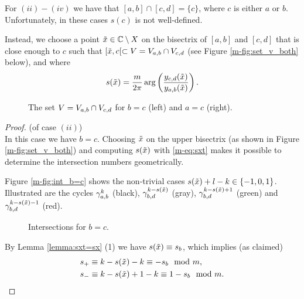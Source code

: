 \documentclass[main.tex]{subfiles}
\begin{document}
  For $(ii)-(iv)$ we have that $[a,b] \cap [c,d] = \{c \}$, where $c$ is either $a$ or $b$. Unfortunately, in these cases $s(c)$ is not
  well-defined.
  
 Instead, we choose a point $\tilde{x} \in \mathbb{C} \setminus X$ on the bisectrix of
  $[a,b]$ and $[c,d]$ that is close enough to $c$ such that $[\tilde{x},c[ \subset V = V_{a,b} \cap V_{c,d}$
  (see Figure \ref{m-fig:set_v_both} below), and where
  \begin{equation}\label{eq:sxt}
   s(\tilde{x}) = \frac{m}{2\pi} \arg \left( \frac{y_{c,d}(\tilde{x})}{y_{a,b}(\tilde{x})} \right).
  \end{equation}
    \begin{figure}[H]
      \begin{center}
   \scalebox{.9}{}
      \end{center}
     \vspace{-1cm}
    \caption{The set $V = V_{a,b} \cap V_{c,d}$ for $b=c$ (left) and $a=c$ (right).}
    \label{fig:set_v_both}
   \end{figure}
   
   \begin{proof}\let\qed\relax (of case $(ii)$) \\
   In this case we have $b = c$. Choosing $\tilde{x}$ on the upper bisectrix (as shown in Figure \ref{m-fig:set_v_both}) 
   and computing $s(\tilde{x})$ with \eqref{m-eq:sxt} makes it possible to determine the intersection numbers geometrically.
   
   Figure \ref{m-fig:int_b=c} shows the non-trivial cases $s(\tilde{x}) + l - k \in \{-1,0,1\}$.
   Illustrated are the cycles $\gamma_{a,b}^k$ (black), $\gamma_{b,d}^{k-s(\tilde{x})}$ (gray), $\gamma_{b,d}^{k-s(\tilde{x}) + 1 }$ (green) and
    $\gamma_{b,d}^{k-s(\tilde{x})-1}$ (red).
    \begin{figure}[H]
      \begin{center}
   \scalebox{0.8}{}
      \end{center}
    \caption{Intersections for $b=c$.}
    \label{fig:int_b=c}
   \end{figure}
    By Lemma \ref{lemma:sxt=sx} (1) we have $s(\tilde{x}) \equiv s_b$, which implies (as claimed)
    \begin{align*}
    & s_+ \equiv k-s(\tilde{x})-k \equiv -s_b \mod m, \\
    & s_- \equiv k-s(\tilde{x})+1-k \equiv 1-s_b \mod m.
    \end{align*}
   \end{proof}
 
\end{document}
